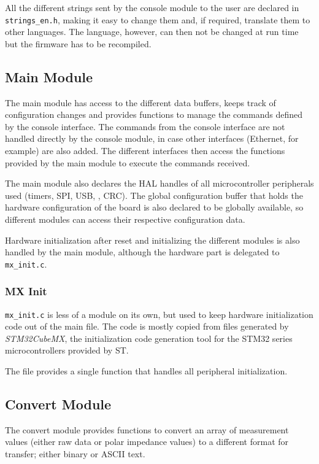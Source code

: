 All the different strings sent by the console module to the user are declared in \verb!strings_en.h!, making it easy
to change them and, if required, translate them to other languages. The language, however, can then not be changed
at run time but the firmware has to be recompiled.


\subsection{Main Module}

The main module has access to the different data buffers, keeps track of configuration changes and provides functions
to manage the commands defined by the console interface. The commands from the console interface are not handled
directly by the console module, in case other interfaces (Ethernet, for example) are also added. The different
interfaces then access the functions provided by the main module to execute the commands received.

The main module also declares the HAL handles of all microcontroller peripherals used (timers, SPI, USB, \iic{}, CRC).
The global configuration buffer that holds the hardware configuration of the board is also declared to be globally
available, so different modules can access their respective configuration data.

Hardware initialization after reset and initializing the different modules is also handled by the main module, although
the hardware part is delegated to \verb!mx_init.c!.

\subsubsection{MX Init}

\verb!mx_init.c! is less of a module on its own, but used to keep hardware initialization code out of the main file.
The code is mostly copied from files generated by \emph{STM32CubeMX}, the initialization code generation tool for the
STM32 series microcontrollers provided by ST.

The file provides a single function that handles all peripheral initialization.


\subsection{Convert Module}

The convert module provides functions to convert an array of measurement values (either raw data or polar
impedance values) to a different format for transfer; either binary or ASCII text.

